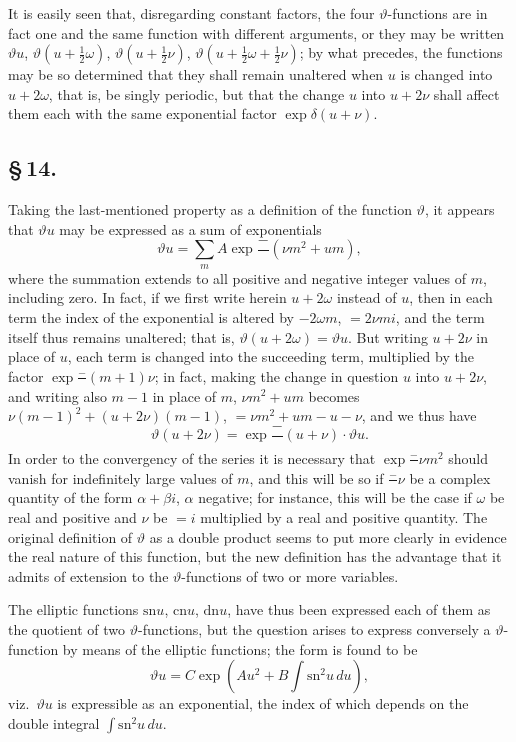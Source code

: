 \documentclass[11pt,a4paper]{book}
\providecommand{\sn}{\mathrm{sn}}
\providecommand{\cn}{\mathrm{cn}}
\providecommand{\dn}{\mathrm{dn}}
\begin{document}
It is easily seen that, disregarding constant factors, the four $\vartheta$-functions are in fact one and the same function with different arguments, or they may be written $\vartheta u$, $\vartheta(u + \frac{1}{2}\omega)$, $\vartheta(u + \frac{1}{2}\nu)$, $\vartheta(u + \frac{1}{2}\omega + \frac{1}{2}\nu)$; by what precedes, the functions may be so determined that they shall remain unaltered when $u$ is changed into $u + 2\omega$, that is, be singly periodic, but that the change $u$ into $u + 2\nu$ shall affect them each with the same exponential factor $\exp\delta(u + \nu)$.

\subsection*{\S\,14.}

Taking the last-mentioned property as a definition of the function $\vartheta$, it appears that $\vartheta u$ may be expressed as a sum of exponentials
\[
\vartheta u = \sum_{m} A\exp\frac{-}{}(\nu m^{2} + um),
\]
where the summation extends to all positive and negative integer values of $m$, including zero. In fact, if we first write herein $u + 2\omega$ instead of $u$, then in each term the index of the exponential is altered by $-2\omega m$, $= 2\nu m i$, and the term itself thus remains unaltered; that is, $\vartheta(u + 2\omega) = \vartheta u$. But writing $u + 2\nu$ in place of $u$, each term is changed into the succeeding term, multiplied by the factor $\exp\frac{-}{}(m + 1)\nu$; in fact, making the change in question $u$ into $u + 2\nu$, and writing also $m - 1$ in place of $m$, $\nu m^{2} + um$ becomes $\nu(m - 1)^{2} + (u + 2\nu)(m - 1)$, $= \nu m^{2} + um - u - \nu$, and we thus have
\[
\vartheta(u + 2\nu) = \exp\frac{-}{}(u + \nu) \cdot \vartheta u.
\]
In order to the convergency of the series it is necessary that $\exp\frac{-}{}\nu m^{2}$ should vanish for indefinitely large values of $m$, and this will be so if $\frac{-}{}\nu$ be a complex quantity of the form $\alpha + \beta i$, $\alpha$ negative; for instance, this will be the case if $\omega$ be real and positive and $\nu$ be $= i$ multiplied by a real and positive quantity. The original definition of $\vartheta$ as a double product seems to put more clearly in evidence the real nature of this function, but the new definition has the advantage that it admits of extension to the $\vartheta$-functions of two or more variables.

The elliptic functions $\sn u$, $\cn u$, $\dn u$, have thus been expressed each of them as the quotient of two $\vartheta$-functions, but the question arises to express conversely a $\vartheta$-function by means of the elliptic functions; the form is found to be
\[
\vartheta u = C\exp\left(Au^{2} + B\int\sn^{2}u\,du\right),
\]
viz.\ $\vartheta u$ is expressible as an exponential, the index of which depends on the double integral $\int\sn^{2}u\,du$.
\end{document}
